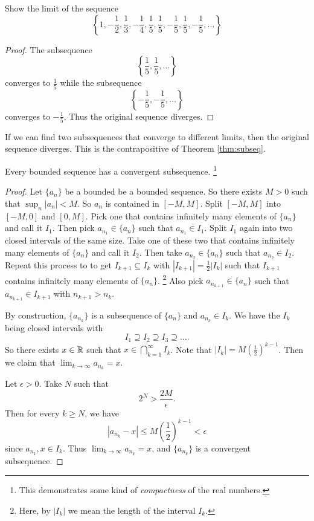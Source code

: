 \begin{exercise}
  Show the limit of the sequence
  \[
    \left\{1, -\frac{1}{2}, \frac{1}{3}, -\frac{1}{4}, \frac{1}{5}, \frac{1}{5}, -\frac{1}{5}, \frac{1}{5}, -\frac{1}{5}, \dots\right\}
  \]
\end{exercise}

\begin{proof}
  The subsequence
  \[\left\{\frac{1}{5}, \frac{1}{5}, \dots\right\}\]
  converges to $\frac{1}{5}$ while the subsequence
  \[\left\{-\frac{1}{5}, -\frac{1}{5}, \dots\right\}\]
  converges to $-\frac{1}{5}$. Thus the original
  sequence diverges.
\end{proof}

\begin{remark}
  If we can find two subsequences that converge to different
  limits, then the original sequence diverges.
  This is the contrapositive of Theorem \ref{thm:subseq}.
\end{remark}

\begin{theorem}
  Every bounded sequence has a convergent subsequence.
  \footnote{This demonstrates some kind of
    \textit{compactness} of the real numbers.}
\end{theorem}

\begin{proof}
  Let $\{a_n\}$ be a bounded  be a bounded sequence.
  So there exists $M > 0$ such that $\sup_{n} |a_n| < M$.
  So $a_n$ is contained in $[-M, M]$. Split
  $[-M, M]$ into $[-M, 0]$ and $[0, M]$.
  Pick one that contains infinitely many elements of
  $\{a_n\}$ and call it $I_1$. Then pick
  $a_{n_1} \in \{a_n\}$ such that $a_{n_1} \in I_1$.
  Split $I_1$ again into two closed intervals of
  the same size. Take one of these two that contains
  infinitely many elements of $\{a_n\}$ and call it $I_2$.
  Then take $a_{n_2} \in \{a_n\}$ such that
  $a_{n_2} \in I_2$. Repeat this process to to get
  $I_{k+1} \subseteq I_k$ with
  $|I_{k+1}| = \frac{1}{2}|I_k|$ such that $I_{k+1}$
  contains infinitely many elements of $\{a_n\}$.
  \footnote{Here, by $|I_k|$ we mean the length of the
    interval $I_k$.}
  Also pick $a_{n_{k+1}} \in \{a_n\}$ such that
  $a_{n_{k+1}} \in I_{k+1}$ with $n_{k + 1} > n_k$.
  
  By construction, $\{a_{n_k}\}$ is a subsequence of
  $\{a_n\}$ and $a_{n_k} \in I_k$. We have the
  $I_k$ being closed intervals with
  \[
  I_1 \supseteq I_2 \supseteq I_3 \supseteq \dots
  .\]
  So there exists $x \in \mathbb{R}$ such that
  $x \in \bigcap_{k = 1}^{\infty} I_k$. Note that
  $|I_k| = M\left(\frac{1}{2}\right)^{k-1}$. Then we claim
  that $\lim_{k \to \infty} a_{n_k} = x$.

  Let $\epsilon > 0$. Take $N$ such that
  \[2^N > \frac{2M}{\epsilon}.\]
  Then for every $k \ge N$, we have
  \[
    |a_{n_k} - x| \le M \left(\frac{1}{2}\right)^{k - 1}
    < \epsilon
  \]
  since $a_{n_k}, x \in I_k$.
  Thus $\lim_{k \to \infty} a_{n_k} = x$, and
  $\{a_{n_k}\}$ is a convergent subsequence.
\end{proof}
